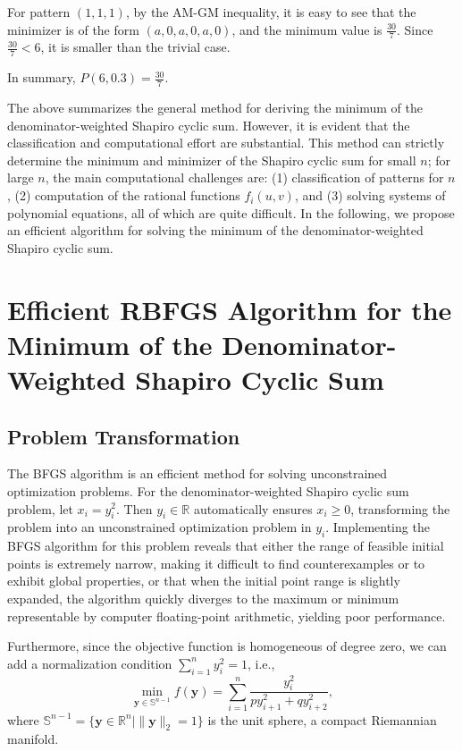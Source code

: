 \documentclass[a4paper,fleqn,numbers]{cas-sc}
\begin{document}
	For pattern $(1,1,1)$, by the AM-GM inequality, it is easy to see that the minimizer is of the form $(a,0,a,0,a,0)$, and the minimum value is $\frac{30}{7}$. Since $\frac{30}{7}<6$, it is smaller than the trivial case.
	
	In summary, $P(6,0.3)=\frac{30}{7}$.
	
	The above summarizes the general method for deriving the minimum of the denominator-weighted Shapiro cyclic sum. However, it is evident that the classification and computational effort are substantial. This method can strictly determine the minimum and minimizer of the Shapiro cyclic sum for small $n$; for large $n$, the main computational challenges are: (1) classification of patterns for $n$, (2) computation of the rational functions $f_i(u,v)$, and (3) solving systems of polynomial equations, all of which are quite difficult. In the following, we propose an efficient algorithm for solving the minimum of the denominator-weighted Shapiro cyclic sum.
	
	\section{Efficient RBFGS Algorithm for the Minimum of the Denominator-Weighted Shapiro Cyclic Sum}
	\subsection{Problem Transformation}
	
	The BFGS algorithm is an efficient method for solving unconstrained optimization problems. For the denominator-weighted Shapiro cyclic sum problem, let $x_i = y_i^2$. Then $y_i \in \mathbb{R}$ automatically ensures $x_i \geq 0$, transforming the problem into an unconstrained optimization problem in $y_i$. Implementing the BFGS algorithm for this problem reveals that either the range of feasible initial points is extremely narrow, making it difficult to find counterexamples or to exhibit global properties, or that when the initial point range is slightly expanded, the algorithm quickly diverges to the maximum or minimum representable by computer floating-point arithmetic, yielding poor performance.
	
	Furthermore, since the objective function is homogeneous of degree zero, we can add a normalization condition $\sum_{i=1}^n y_i^2 = 1$, i.e.,
	\[
	\min_{\mathbf{y} \in \mathbb{S}^{n-1}} f(\mathbf{y}) = \sum_{i=1}^{n} \frac{y_i^2}{p y_{i+1}^2 + q y_{i+2}^2},
	\]
	where $\mathbb{S}^{n-1} = \{\mathbf{y} \in \mathbb{R}^n \mid \|\mathbf{y}\|_2 = 1\}$ is the unit sphere, a compact Riemannian manifold.
	
\end{document}
